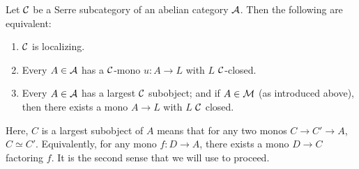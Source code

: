 \begin{prop}\label{prop_1_7}
Let $\mathcal{C}$ be a Serre subcategory of an abelian category 
$\mathcal{A}$. Then the following are equivalent:
\begin{enumerate}
\item $\mathcal{C}$ is localizing.

\item Every $A \in \mathcal{A}$ has a $\mathcal{C}$-mono $u: A \to L$
with $L$ $\mathcal{C}$-closed.

\item Every $A \in \mathcal{A}$ has a largest $\mathcal{C}$ subobject;
and if $A \in \mathcal{M}$ (as introduced above), then there exists
a mono $A \to L$ with $L$ $\mathcal{C}$ closed.
\end{enumerate}
\end{prop}
\begin{rmk}
Here, $C$ is a largest subobject of $A$ means that for any
two monos $C \to C' \to A$, $C \simeq C'$. Equivalently, for
any mono $f: D \to A$, there exists a mono $D \to C$ factoring
$f$. It is the second sense that we will use to proceed.
\end{rmk}
